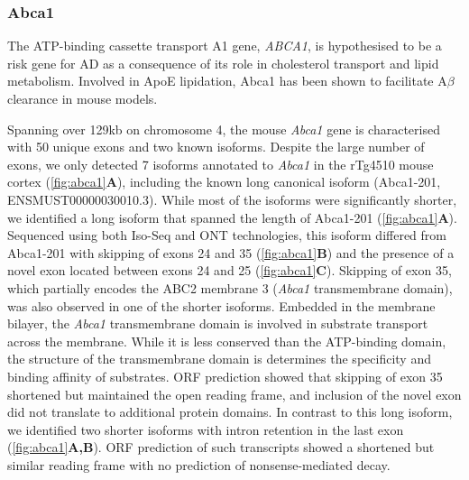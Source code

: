 \clearpage
\subsubsection{Abca1}
The ATP-binding cassette transport A1 gene, \textit{ABCA1}, is hypothesised to be a risk gene for AD as a consequence of its role in cholesterol transport and lipid metabolism\cite{Nordestgaard2015}. Involved in ApoE lipidation, Abca1 has been shown to facilitate A$\beta$ clearance in mouse models\cite{Fitz2012}. 

Spanning over 129kb on chromosome 4, the mouse \textit{Abca1} gene is characterised with 50 unique exons and two known isoforms. Despite the large number of exons, we only detected 7 isoforms annotated to \textit{Abca1} in the rTg4510 mouse cortex (\cref{fig:abca1}\textbf{A}), including the known long canonical isoform (Abca1-201, ENSMUST00000030010.3). While most of the isoforms were significantly shorter, we identified a long isoform that spanned the length of Abca1-201 (\cref{fig:abca1}\textbf{A}). Sequenced using both Iso-Seq and ONT technologies, this isoform differed from Abca1-201 with skipping of exons 24 and 35 (\cref{fig:abca1}\textbf{B}) and the presence of a novel exon located between exons 24 and 25 (\cref{fig:abca1}\textbf{C}). Skipping of exon 35, which partially encodes the ABC2 membrane 3 (\textit{Abca1} transmembrane domain), was also observed in one of the shorter isoforms. Embedded in the membrane bilayer, the \textit{Abca1} transmembrane domain is involved in substrate transport across the membrane. While it is less conserved than the ATP-binding domain, the structure of the transmembrane domain is determines the specificity and binding affinity of substrates. ORF prediction showed that skipping of exon 35 shortened but maintained the open reading frame, and inclusion of the novel exon did not translate to additional protein domains. In contrast to this long isoform, we identified two shorter isoforms with intron retention in the last exon (\cref{fig:abca1}\textbf{A,B}). ORF prediction of such transcripts showed a shortened but similar reading frame with no prediction of nonsense-mediated decay. 

